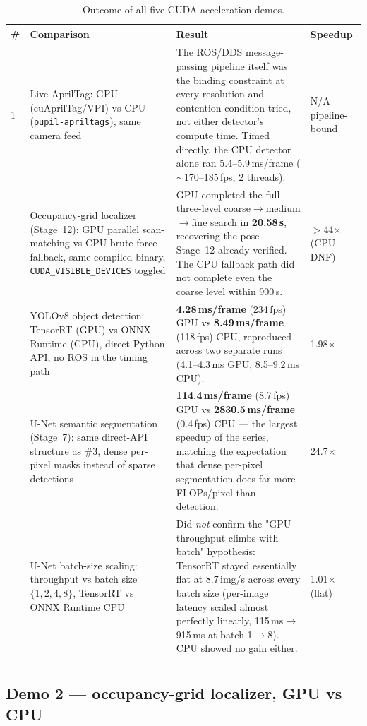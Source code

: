 \documentclass[11pt,a4paper]{article}
\begin{document}
\begin{longtable}{@{}p{0.7cm}p{4.4cm}p{7.3cm}p{2.3cm}@{}}
\toprule
\textbf{\#} & \textbf{Comparison} & \textbf{Result} & \textbf{Speedup} \\
\midrule
\endhead
1 & Live AprilTag: GPU (cuAprilTag/VPI) vs CPU (\texttt{pupil-apriltags}), same camera feed &
  The ROS/DDS message-passing pipeline itself was the binding constraint at every resolution and contention condition tried, not either detector's compute time. Timed directly, the CPU detector alone ran 5.4--5.9\,ms/frame ($\sim$170--185\,fps, 2 threads). & N/A --- pipeline-bound \\
\addlinespace
2 & Occupancy-grid localizer (Stage~12): GPU parallel scan-matching vs CPU brute-force fallback, same compiled binary, \texttt{CUDA\_VISIBLE\_DEVICES} toggled &
  GPU completed the full three-level coarse$\to$medium$\to$fine search in \textbf{20.58\,s}, recovering the pose Stage~12 already verified. The CPU fallback path did not complete even the coarse level within 900\,s. & $>$44$\times$ (CPU DNF) \\
\addlinespace
3 & YOLOv8 object detection: TensorRT (GPU) vs ONNX Runtime (CPU), direct Python API, no ROS in the timing path &
  \textbf{4.28\,ms/frame} (234\,fps) GPU vs \textbf{8.49\,ms/frame} (118\,fps) CPU, reproduced across two separate runs (4.1--4.3\,ms GPU, 8.5--9.2\,ms CPU). & 1.98$\times$ \\
\addlinespace
4 & U-Net semantic segmentation (Stage~7): same direct-API structure as \#3, dense per-pixel masks instead of sparse detections &
  \textbf{114.4\,ms/frame} (8.7\,fps) GPU vs \textbf{2830.5\,ms/frame} (0.4\,fps) CPU --- the largest speedup of the series, matching the expectation that dense per-pixel segmentation does far more FLOPs/pixel than detection. & 24.7$\times$ \\
\addlinespace
5 & U-Net batch-size scaling: throughput vs batch size $\{1,2,4,8\}$, TensorRT vs ONNX Runtime CPU &
  Did \emph{not} confirm the "GPU throughput climbs with batch" hypothesis: TensorRT stayed essentially flat at 8.7\,img/s across every batch size (per-image latency scaled almost perfectly linearly, 115\,ms$\to$915\,ms at batch 1$\to$8). CPU showed no gain either. & 1.01$\times$ (flat) \\
\bottomrule
\caption{Outcome of all five CUDA-acceleration demos.}
\label{tab:demos}
\end{longtable}

\subsection{Demo 2 --- occupancy-grid localizer, GPU vs CPU}
\end{document}
